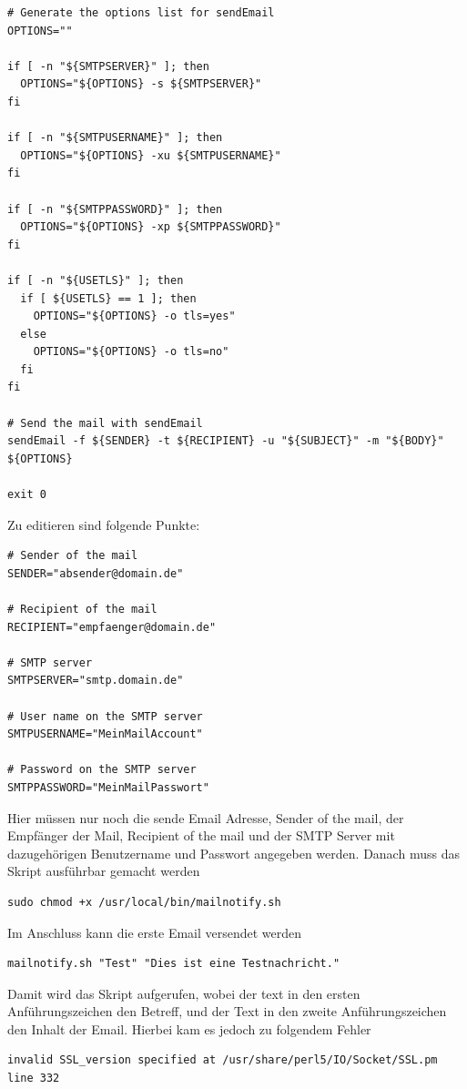 \documentclass[11pt,a4paper]{article} %
\begin{document}
\begin{frame}
\begin{lstlisting}
# Generate the options list for sendEmail
OPTIONS=""

if [ -n "${SMTPSERVER}" ]; then
  OPTIONS="${OPTIONS} -s ${SMTPSERVER}"
fi

if [ -n "${SMTPUSERNAME}" ]; then
  OPTIONS="${OPTIONS} -xu ${SMTPUSERNAME}"
fi

if [ -n "${SMTPPASSWORD}" ]; then
  OPTIONS="${OPTIONS} -xp ${SMTPPASSWORD}"
fi

if [ -n "${USETLS}" ]; then
  if [ ${USETLS} == 1 ]; then
    OPTIONS="${OPTIONS} -o tls=yes"
  else
    OPTIONS="${OPTIONS} -o tls=no"
  fi
fi

# Send the mail with sendEmail
sendEmail -f ${SENDER} -t ${RECIPIENT} -u "${SUBJECT}" -m "${BODY}" ${OPTIONS}

exit 0
\end{lstlisting}
\end{frame}

Zu editieren sind folgende Punkte:
\begin{frame}

\begin{lstlisting}
# Sender of the mail
SENDER="absender@domain.de"

# Recipient of the mail
RECIPIENT="empfaenger@domain.de"

# SMTP server
SMTPSERVER="smtp.domain.de"

# User name on the SMTP server
SMTPUSERNAME="MeinMailAccount"

# Password on the SMTP server
SMTPPASSWORD="MeinMailPasswort"
\end{lstlisting}
\end{frame}
Hier müssen nur noch die sende Email Adresse, Sender of the mail, der Empfänger der Mail, Recipient of the mail und der SMTP Server mit dazugehörigen Benutzername und Passwort angegeben werden.
Danach muss das Skript ausführbar gemacht werden
\begin{frame}

\begin{lstlisting}
sudo chmod +x /usr/local/bin/mailnotify.sh
\end{lstlisting}
\end{frame}

Im Anschluss kann die erste Email versendet werden
\begin{frame}

\begin{lstlisting}
mailnotify.sh "Test" "Dies ist eine Testnachricht."

\end{lstlisting}
\end{frame}
\newpage
Damit wird das Skript aufgerufen, wobei der text in den ersten Anführungszeichen den Betreff, und der Text in den zweite Anführungszeichen den Inhalt der Email.
Hierbei kam es jedoch zu folgendem Fehler
\begin{frame}

\begin{lstlisting}
invalid SSL_version specified at /usr/share/perl5/IO/Socket/SSL.pm line 332

\end{lstlisting}
\end{frame}
\end{document}
